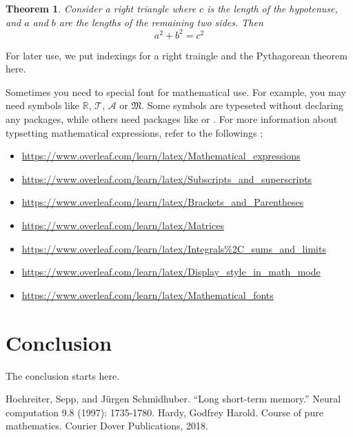 \documentclass{report}
\newtheorem{theorem}{Theorem} %
\begin{document}
\begin{theorem}
Consider a right triangle where \(c\) is the length of the hypotenuse, and \(a\) and \(b\) are the lengths of the remaining two sides.
Then
\begin{equation}
a^2+b^2=c^2
\end{equation}
\end{theorem}
For later use, we put indexings for a right traingle and the Pythagorean theorem here.

Sometimes you need to special font for mathematical use.
For example, you may need symbols like \(\mathbb R\), \(\mathcal T\), \(\mathscr A\) or \(\mathfrak M\).
Some symbols are typeseted without declaring any packages, while others need packages like  or .
For more information about typsetting mathematical expressions, refer to the followings ;
\begin{itemize}
\item
\url{https://www.overleaf.com/learn/latex/Mathematical_expressions}
\item
\url{https://www.overleaf.com/learn/latex/Subscripts_and_superscripts}
\item
\url{https://www.overleaf.com/learn/latex/Brackets_and_Parentheses}
\item
\url{https://www.overleaf.com/learn/latex/Matrices}
\item
\url{https://www.overleaf.com/learn/latex/Integrals\%2C_sums_and_limits}
\item
\url{https://www.overleaf.com/learn/latex/Display_style_in_math_mode}
\item
\url{https://www.overleaf.com/learn/latex/Mathematical_fonts}
\end{itemize}

\chapter{Conclusion}\label{chap:conclusion}
The conclusion starts here.

\newpage
\renewcommand\bibname{Reference}
\begin{thebibliography}{AA}
 Hochreiter, Sepp, and Jürgen Schmidhuber. ``Long short-term memory.'' Neural computation 9.8 (1997): 1735-1780.
 Hardy, Godfrey Harold. Course of pure mathematics. Courier Dover Publications, 2018.
\end{thebibliography}
\end{document}
